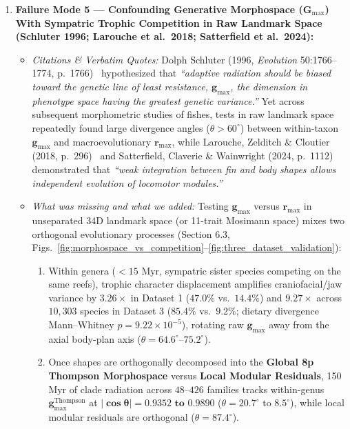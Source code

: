 \documentclass[11pt,a4paper]{article}
\theoremstyle{definition}
\theoremstyle{remark}
\begin{document}
\begin{enumerate}
  \item \textbf{Failure Mode 5 --- Confounding Generative Morphospace ($\mathbf{G}_{\max}$) With Sympatric Trophic Competition in Raw Landmark Space (Schluter 1996; Larouche et al.\ 2018; Satterfield et al.\ 2024):}
  \begin{itemize}
    \item \emph{Citations \& Verbatim Quotes:} Dolph Schluter (1996, \emph{Evolution} 50:1766--1774, p.\ 1766)~\cite{Schluter1996} hypothesized that \emph{``adaptive radiation should be biased toward the genetic line of least resistance, $\mathbf{g}_{\max}$, the dimension in phenotype space having the greatest genetic variance.''} Yet across subsequent morphometric studies of fishes, tests in raw landmark space repeatedly found large divergence angles ($\theta > 60^\circ$) between within-taxon $\mathbf{g}_{\max}$ and macroevolutionary $\mathbf{r}_{\max}$, while Larouche, Zelditch \& Cloutier (2018, p.\ 296)~\cite{Larouche2018} and Satterfield, Claverie \& Wainwright (2024, p.\ 1112)~\cite{Satterfield2024} demonstrated that \emph{``weak integration between fin and body shapes allows independent evolution of locomotor modules.''}
    \item \emph{What was missing and what we added:} Testing $\mathbf{g}_{\max}$ versus $\mathbf{r}_{\max}$ in unseparated 34D landmark space (or 11-trait Mosimann space) mixes two orthogonal evolutionary processes (Section 6.3, Figs.~\ref{fig:morphospace_vs_competition}--\ref{fig:three_dataset_validation}):
    \begin{enumerate}
      \item Within genera ($<15\text{ Myr}$, sympatric sister species competing on the same reefs), trophic character displacement amplifies craniofacial/jaw variance by $\mathbf{3.26\times}$ in Dataset 1 ($47.0\%$ vs.\ $14.4\%$) and $\mathbf{9.27\times}$ across $10{,}303$ species in Dataset 3 ($85.4\%$ vs.\ $9.2\%$; dietary divergence Mann--Whitney $p = 9.22 \times 10^{-5}$), rotating raw $\mathbf{g}_{\max}$ away from the axial body-plan axis ($\theta = 64.6^\circ\text{--}75.2^\circ$).
      \item Once shapes are orthogonally decomposed into the \textbf{Global 8p Thompson Morphospace} versus \textbf{Local Modular Residuals}, 150 Myr of clade radiation across $48\text{--}426$ families tracks within-genus $\mathbf{g}_{\max}^{\mathrm{Thompson}}$ at $\mathbf{|\cos\theta| = 0.9352\text{ to }0.9890}$ ($\theta = 20.7^\circ\text{ to }8.5^\circ$), while local modular residuals are orthogonal ($\theta = 87.4^\circ$).
    \end{enumerate}
  \end{itemize}
\end{enumerate}
\end{document}
